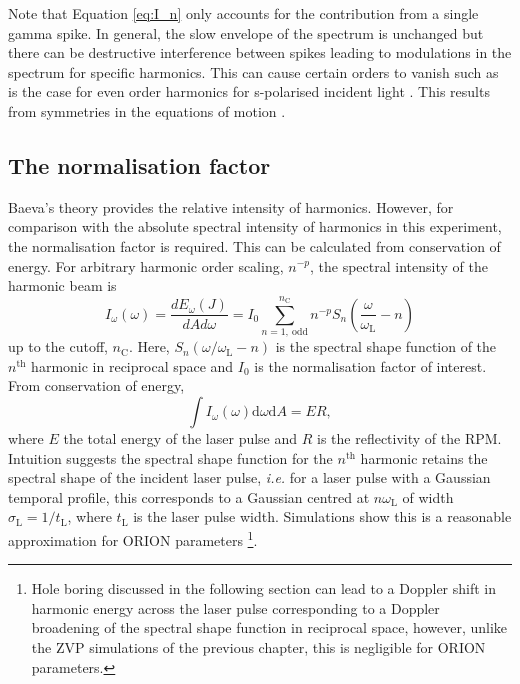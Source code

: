 Note that Equation \ref{eq:I_n} only accounts for the contribution from a single gamma spike. In general, the slow envelope of the spectrum is unchanged \cite{baevaHighHarmonicGeneration2008} but there can be destructive interference between spikes leading to modulations in the spectrum for specific harmonics. This can cause certain orders to vanish such as is the case for even order harmonics for s-polarised incident light \cite{lichtersShortpulseLaserHarmonics1996}. This results from symmetries in the equations of motion \cite{trinesLaserHarmonicGeneration2023}. 


\subsection{The normalisation factor}
Baeva's theory provides the relative intensity of harmonics. However, for comparison with the absolute spectral intensity of harmonics in this experiment, the normalisation factor is required. This can be calculated from conservation of energy. For arbitrary harmonic order scaling, $n^{-p}$, the spectral intensity of the harmonic beam is
\begin{equation}
	I_\omega(\omega) = \frac{dE_\omega(J)}{dAd\omega} = I_0 \sum^{n_\mathrm{C}}_{n = 1,\ \mathrm{odd}} n^{-p} S_n\left( \frac{\omega}{\omega_\mathrm{L}}-n\right)
\end{equation}
up to the cutoff, $n_\mathrm{C}$. Here, $S_n(\omega/\omega_\mathrm{L}-n)$ is the spectral shape function of the $n^\mathrm{th}$ harmonic in reciprocal space and $I_0$ is the normalisation factor of interest. From conservation of energy,
\begin{equation}
	\int I_\omega(\omega) \mathrm{d}\omega \mathrm{d} A = ER,
\end{equation}
where $E$ the total energy of the laser pulse and $R$ is the reflectivity of the \ac{RPM}. Intuition suggests the spectral shape function for the $n^\mathrm{th}$ harmonic retains the spectral shape of the incident laser pulse, \textit{i.e.} for a laser pulse with a Gaussian temporal profile, this corresponds to a Gaussian centred at $n\omega_\mathrm{L}$ of width $\sigma_\mathrm{L} = 1/t_\mathrm{L}$, where $t_\mathrm{L}$ is the laser pulse width. Simulations show this is a reasonable approximation for ORION parameters \footnote{Hole boring discussed in the following section can lead to a Doppler shift in harmonic energy across the laser pulse corresponding to a Doppler broadening of the spectral shape function in reciprocal space, however, unlike the ZVP simulations of the previous chapter, this is negligible for ORION parameters.}.

